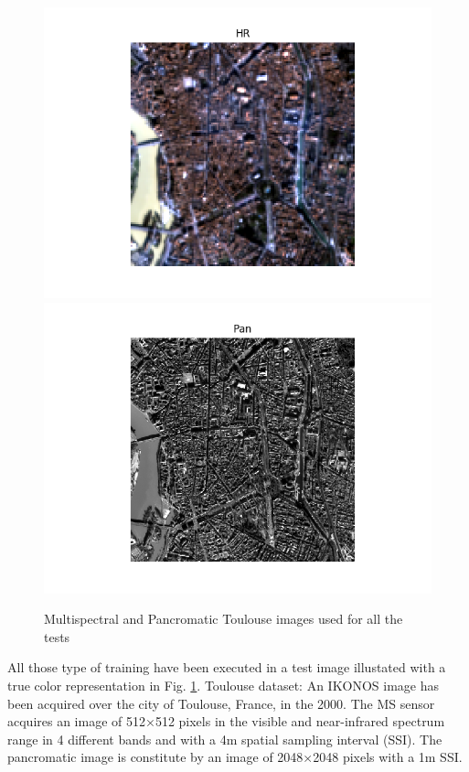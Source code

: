 \documentclass[12pt]{report}
\begin{document}
\begin{figure}[t]
    \centering
    \includegraphics[scale=.5]{toulouse.png}
    \includegraphics[scale=.5]{toulouse_pan.png}
    \caption{Multispectral and Pancromatic Toulouse images used for all the tests}
    \label{fig:toulouse}
\end{figure}


All those type of training have been executed in a test image illustated with a true color representation in Fig. \ref{fig:toulouse}.
Toulouse dataset: An IKONOS image has been acquired over the city of Toulouse, France, in the 2000.
The MS sensor acquires an image of 512×512 pixels in the visible and near-infrared spectrum range in 4
different bands and with a 4m spatial sampling interval (SSI). 
The pancromatic image is constitute by an image of 2048×2048 pixels with a 1m SSI.
\end{document}
